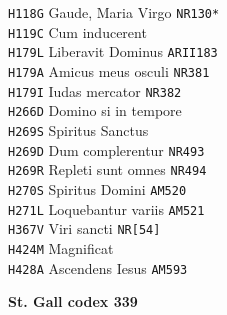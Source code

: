 \documentclass[a4paper]{article}
\begin{document}
{\begin{multicols}{2}
\texttt{H118G} Gaude, Maria Virgo \texttt{NR130*}\\
\texttt{H119C} Cum inducerent\\
\texttt{H179L} Liberavit Dominus \texttt{ARII183}\\
\texttt{H179A} Amicus meus osculi \texttt{NR381}\\
\texttt{H179I} Iudas mercator \texttt{NR382}\\
\texttt{H266D} Domino si in tempore\\
\texttt{H269S} Spiritus Sanctus\\
\texttt{H269D} Dum complerentur \texttt{NR493}\\
\texttt{H269R} Repleti sunt omnes \texttt{NR494}\\
\texttt{H270S} Spiritus Domini \texttt{AM520}\\
\texttt{H271L} Loquebantur variis \texttt{AM521}\\
\texttt{H367V} Viri sancti \texttt{NR[54]}\\
\texttt{H424M} Magnificat\\
\texttt{H428A} Ascendens Iesus \texttt{AM593}

\noindent\textbf{St. Gall codex 339}


\end{multicols}}
\end{document}
